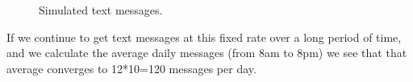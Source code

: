 \begin{knitrout}
\begin{figure}
{}

\caption[Simulated text messages]{Simulated text messages.}\label{fig:intro-lln2-0}
\end{figure}

\end{knitrout}


If we continue to get text messages at this fixed rate over a long period of time, and we calculate the average daily messages (from 8am to 8pm) we see that that average converges to 12*10=120 messages per day. 
